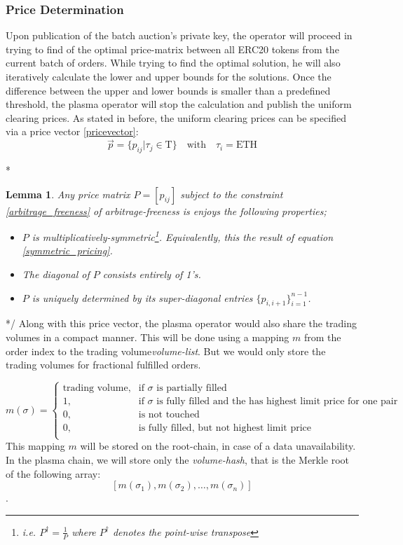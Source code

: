 \documentclass[11pt,parskip=full]{scrartcl}%
\newcommand{\Tau}{\mathrm{T}}
\newtheorem{lemma}[theorem]{Lemma}
\newcommand*{\erc}{ERC20 }
\begin{document}
\subsubsection*{Price Determination}
Upon publication of the batch auction's private key, the operator will proceed in trying to find of the optimal price-matrix between all \erc tokens from the current batch of orders. 
While trying to find the optimal solution, he will also iteratively calculate the lower and upper bounds for the solutions. Once the difference between the upper and lower bounds is smaller than a predefined threshold, the plasma operator will stop the calculation and publish the uniform clearing prices.\newline
As stated in before, the uniform clearing prices can be specified via a price vector \ref{pricevector}:
\begin{equation}
\vec{p}=\{ p_{ij}| \tau_j \in \Tau \} \quad \text{with} \quad \tau_i =\text{ETH}
\end{equation}

\/* 
\begin{lemma}
Any price matrix $P = [p_{ij}]$ subject to the constraint \ref{arbitrage_freeness} of arbitrage-freeness is enjoys the following properties;
\begin{itemize}
\item[(i)] $P$ is multiplicatively-symmetric\footnote{i.e. $P^\dagger = \frac{1}{P}$ where $P^\dagger$ denotes the point-wise transpose}. Equivalently, this the result of equation \ref{symmetric_pricing}.
\item[(ii)] The diagonal of $P$ consists entirely of 1's.
\item[(iii)]  $P$ is uniquely determined by its super-diagonal entries $\{p_{i, i+1}\}_{i=1}^{n-1}$.
\end{itemize}
\end{lemma}
*/
Along with this price vector, the plasma operator would also share the trading volumes in a compact manner. This will be done using a mapping $m$ from the order index to the trading volume\emph{volume-list}\label{volumeBlock}. But we would only store the trading volumes for fractional fulfilled orders.

\[
    m(\sigma)= 
\begin{cases}
    \text{trading volume},& \text{if } \sigma \text{ is partially filled}\\
    1,        & \text{if } \sigma \text{ is fully filled and the has highest limit price for one pair}\\
    0,              & \text{is not touched} \\
    0,              & \text{is fully filled, but not highest limit price} \\
\end{cases}
\]
This mapping $m$ will be stored on the root-chain, in case of a data unavailability. In the plasma chain, we will store only the \emph{volume-hash}, that is the Merkle root of the following array:
\[[m(\sigma_1), m(\sigma_2), \dots, m(\sigma_n)]\].
\end{document}
